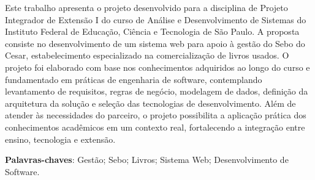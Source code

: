 \begin{resumo}
Este trabalho apresenta o projeto desenvolvido para a disciplina de Projeto Integrador de Extensão I do curso de Análise e Desenvolvimento de Sistemas do Instituto Federal de Educação, Ciência e Tecnologia de São Paulo. A proposta consiste no desenvolvimento de um sistema web para apoio à gestão do Sebo do Cesar, estabelecimento especializado na comercialização de livros usados. O projeto foi elaborado com base nos conhecimentos adquiridos ao longo do curso e fundamentado em práticas de engenharia de software, contemplando levantamento de requisitos, regras de negócio, modelagem de dados, definição da arquitetura da solução e seleção das tecnologias de desenvolvimento. Além de atender às necessidades do parceiro, o projeto possibilita a aplicação prática dos conhecimentos acadêmicos em um contexto real, fortalecendo a integração entre ensino, tecnologia e extensão.
\vspace{\onelineskip}
\noindent

\textbf{Palavras-chaves}: Gestão; Sebo; Livros; Sistema Web; Desenvolvimento de Software.
\end{resumo}